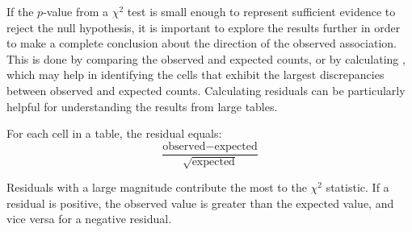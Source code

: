 If the $p$-value from a $\chi^2$ test is small enough to represent sufficient evidence to reject the null hypothesis, it is important to explore the results further in order to make a complete conclusion about the direction of the observed association. This is done by comparing the observed and expected counts, or by calculating , which may help in identifying the cells that exhibit the largest discrepancies between observed and expected counts. Calculating residuals can be particularly helpful for understanding the results from large tables.

For each cell in a table, the residual equals:
\[\dfrac{\text{observed} - \text{expected}}{\sqrt{\text{expected}}} \]

Residuals with a large magnitude contribute the most to the $\chi^2$ statistic. If a residual is positive, the observed value is greater than the expected value, and vice versa for a negative residual.

